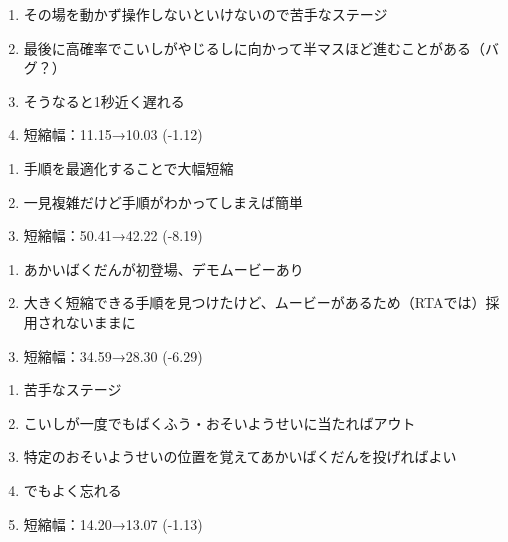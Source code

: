 \begin{enumerate}[label={\sarrow}]
\item その場を動かず操作しないといけないので苦手なステージ
\item 最後に高確率でこいしがやじるしに向かって半マスほど進むことがある（バグ？）
\item そうなると1秒近く遅れる
\item 短縮幅：11.15→10.03 (-1.12)
\end{enumerate}



\begin{enumerate}[label={\sarrow}]
\item 手順を最適化することで大幅短縮
\item 一見複雑だけど手順がわかってしまえば簡単
\item 短縮幅：50.41→42.22 (-8.19)
\end{enumerate}



\begin{enumerate}[label={\sarrow}]
\item あかいばくだんが初登場、デモムービーあり
\item 大きく短縮できる手順を見つけたけど、ムービーがあるため（RTAでは）採用されないままに
\item 短縮幅：34.59→28.30 (-6.29)
\end{enumerate}



\clearpage
\begin{enumerate}[label={\sarrow}]
\item 苦手なステージ
\item こいしが一度でもばくふう・おそいようせいに当たればアウト
\item 特定のおそいようせいの位置を覚えてあかいばくだんを投げればよい
\item でもよく忘れる
\item 短縮幅：14.20→13.07 (-1.13)
\end{enumerate}



